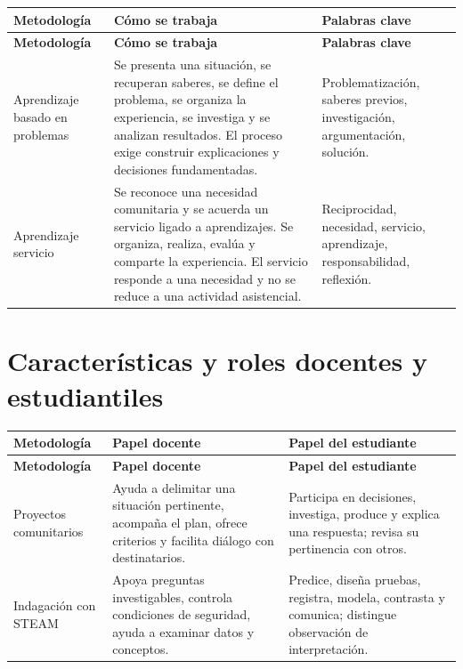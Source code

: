 \documentclass[spanish,letterpaper,oneside]{article}
\begin{document}
{\small{}\renewcommand{\arraystretch}{1.25}
\begin{longtable}{|>{\raggedright\arraybackslash}p{}|>{\raggedright\arraybackslash}p{}|>{\raggedright\arraybackslash}p{}|}\hline
\rowcolor{iiiepePale} \textbf{Metodología} & \textbf{Cómo se trabaja} & \textbf{Palabras clave} \\\hline
\endfirsthead
\hline
\rowcolor{iiiepePale} \textbf{Metodología} & \textbf{Cómo se trabaja} & \textbf{Palabras clave} \\\hline
\endhead
Aprendizaje basado en problemas & Se presenta una situación, se recuperan saberes, se define el problema, se organiza la experiencia, se investiga y se analizan resultados. El proceso exige construir explicaciones y decisiones fundamentadas. & Problematización, saberes previos, investigación, argumentación, solución. \\\hline
Aprendizaje servicio & Se reconoce una necesidad comunitaria y se acuerda un servicio ligado a aprendizajes. Se organiza, realiza, evalúa y comparte la experiencia. El servicio responde a una necesidad y no se reduce a una actividad asistencial. & Reciprocidad, necesidad, servicio, aprendizaje, responsabilidad, reflexión. \\\hline
\end{longtable}}


\section{Características y roles docentes y estudiantiles}


{\small{}\renewcommand{\arraystretch}{1.25}
\begin{longtable}{|>{\raggedright\arraybackslash}p{}|>{\raggedright\arraybackslash}p{}|>{\raggedright\arraybackslash}p{}|}\hline
\rowcolor{iiiepePale} \textbf{Metodología} & \textbf{Papel docente} & \textbf{Papel del estudiante} \\\hline
\endfirsthead
\hline
\rowcolor{iiiepePale} \textbf{Metodología} & \textbf{Papel docente} & \textbf{Papel del estudiante} \\\hline
\endhead
Proyectos comunitarios & Ayuda a delimitar una situación pertinente, acompaña el plan, ofrece criterios y facilita diálogo con destinatarios. & Participa en decisiones, investiga, produce y explica una respuesta; revisa su pertinencia con otros. \\\hline
Indagación con STEAM & Apoya preguntas investigables, controla condiciones de seguridad, ayuda a examinar datos y conceptos. & Predice, diseña pruebas, registra, modela, contrasta y comunica; distingue observación de interpretación. \\\hline
\end{longtable}}
\end{document}
